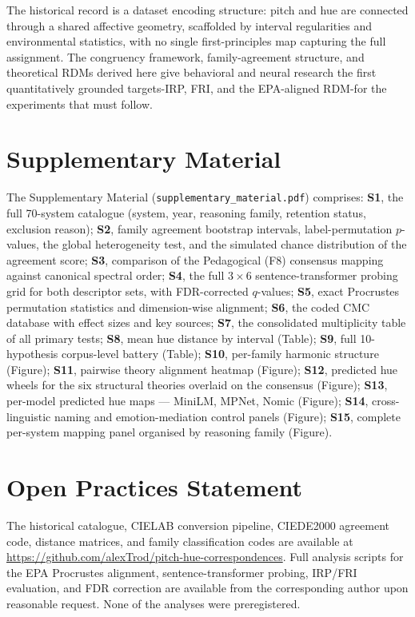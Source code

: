 \documentclass[12pt]{article}
\begin{document}
The historical record is a dataset encoding structure: pitch and hue are connected through a shared
affective geometry, scaffolded by interval regularities and environmental
statistics, with no single first-principles map capturing the full
assignment. The congruency framework, family-agreement structure, and
theoretical RDMs derived here give behavioral and neural research the
first quantitatively grounded targets-IRP, FRI, and the
EPA-aligned RDM-for the experiments that must follow.

\section*{Supplementary Material}

The Supplementary Material (\texttt{supplementary\_material.pdf})
comprises: \textbf{S1}, the full 70-system catalogue (system, year,
reasoning family, retention status, exclusion reason); \textbf{S2},
family agreement bootstrap intervals, label-permutation $p$-values,
the global heterogeneity test, and the simulated chance distribution
of the agreement score; \textbf{S3}, comparison of the Pedagogical
(F8) consensus mapping against canonical spectral order; \textbf{S4},
the full $3 \times 6$ sentence-transformer probing grid for both
descriptor sets, with FDR-corrected $q$-values; \textbf{S5}, exact
Procrustes permutation statistics and dimension-wise alignment;
\textbf{S6}, the coded CMC database with effect sizes and key sources;
\textbf{S7}, the consolidated multiplicity table of all primary tests;
\textbf{S8}, mean hue distance by interval (Table); \textbf{S9}, full
10-hypothesis corpus-level battery (Table); \textbf{S10},
per-family harmonic structure (Figure); \textbf{S11}, pairwise
theory alignment heatmap (Figure); \textbf{S12}, predicted hue wheels
for the six structural theories overlaid on the consensus (Figure);
\textbf{S13}, per-model predicted hue maps — MiniLM, MPNet, Nomic
(Figure); \textbf{S14}, cross-linguistic naming and emotion-mediation
control panels (Figure); \textbf{S15}, complete per-system mapping
panel organised by reasoning family (Figure).

\section*{Open Practices Statement}

The historical catalogue, CIELAB conversion pipeline, CIEDE2000
agreement code, distance matrices, and family classification codes are
available at \url{https://github.com/alexTrod/pitch-hue-correspondences}.
Full analysis scripts for the EPA Procrustes alignment, sentence-transformer
probing, IRP/FRI evaluation, and FDR correction are available from the
corresponding author upon reasonable request.
None of the analyses were preregistered.
\end{document}
